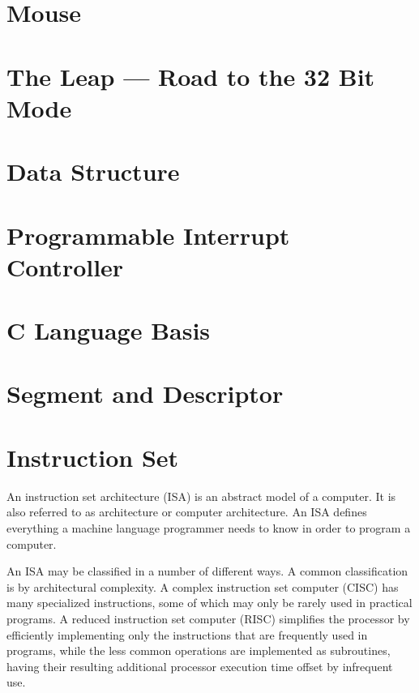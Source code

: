\documentclass{swfcthesis}
\begin{document}
\label{cha:leading-knowledge-1}

\section{Mouse}
\label{sec:mouse}

\section{The Leap --- Road to the 32 Bit Mode}
\label{sec:leap-road-32}



\section{Data Structure}
\label{sec:data-structure}

\section{Programmable Interrupt Controller}
\label{sec:progr-interr-contr}


\section{C Language Basis}
\label{sec:c-language-basis}

\section{Segment and Descriptor}
\label{sec:segment-descriptor}


\section{Instruction Set}
\label{sec:instruction-set}

An instruction set architecture (ISA) is an abstract model of a computer. It is also
referred to as architecture or computer architecture. An ISA defines everything a machine
language programmer needs to know in order to program a computer.

An ISA may be classified in a number of different ways. A common classification is by
architectural complexity. A complex instruction set computer (CISC) has many specialized
instructions, some of which may only be rarely used in practical programs. A reduced
instruction set computer (RISC) simplifies the processor by efficiently implementing only
the instructions that are frequently used in programs, while the less common operations
are implemented as subroutines, having their resulting additional processor execution time
offset by infrequent use.
\end{document}
